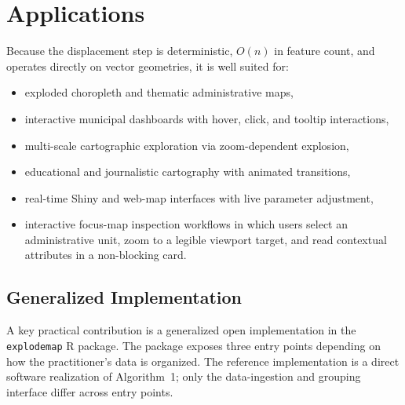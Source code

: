 \documentclass[12pt, a4paper]{article}
\numberwithin{equation}{section}
\begin{document}
\section{Applications}

Because the displacement step is deterministic, $O(n)$ in feature count, and operates directly on vector geometries, it is well suited for:
\begin{itemize}
  \item exploded choropleth and thematic administrative maps,
  \item interactive municipal dashboards with hover, click, and tooltip interactions,
  \item multi-scale cartographic exploration via zoom-dependent explosion,
  \item educational and journalistic cartography with animated transitions,
  \item real-time Shiny and web-map interfaces with live parameter adjustment,
  \item interactive focus-map inspection workflows in which users select an administrative unit, zoom to a legible viewport target, and read contextual attributes in a non-blocking card.
\end{itemize}

\subsection{Generalized Implementation}
\label{sec:genimpl}

A key practical contribution is a generalized open implementation in the \texttt{explodemap} \textsf{R} package. The package exposes three entry points depending on how the practitioner's data is organized. The reference implementation is a direct software realization of Algorithm~1; only the data-ingestion and grouping interface differ across entry points.
\end{document}
